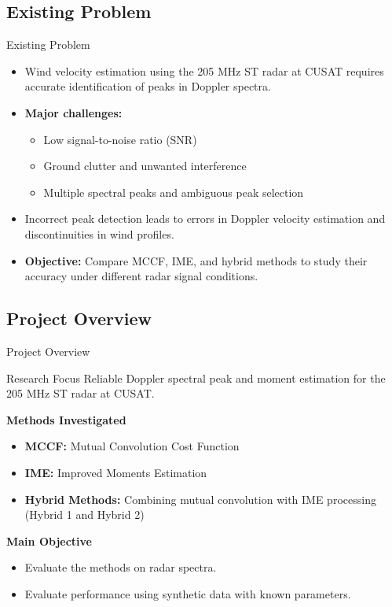 \documentclass[10.5pt]{beamer}
\begin{document}
\subsection{Existing Problem}
\begin{frame}{Existing Problem}
\begin{itemize}
    \item Wind velocity estimation using the 205 MHz ST radar at CUSAT requires accurate identification of peaks in Doppler spectra.

    \item \textbf{Major challenges:}
    \begin{itemize}
        \item Low signal-to-noise ratio (SNR)
        \item Ground clutter and unwanted interference
        \item Multiple spectral peaks and ambiguous peak selection
    \end{itemize}

    \item Incorrect peak detection leads to errors in Doppler velocity
    estimation and discontinuities in wind profiles.

    \item \textbf{Objective:} Compare MCCF, IME, and hybrid methods
    to study their accuracy under different radar signal conditions.
\end{itemize}
\end{frame}

\subsection{Project Overview}
\begin{frame}{Project Overview}
\begin{block}{Research Focus}
Reliable Doppler spectral peak and moment estimation
for the 205 MHz ST radar at CUSAT.
\end{block}

\vspace{0.15cm}

\textbf{Methods Investigated}
\begin{itemize}
    \item \textbf{MCCF:} Mutual Convolution Cost Function
    \item \textbf{IME:} Improved Moments Estimation
    \item \textbf{Hybrid Methods:} Combining mutual convolution with IME processing (Hybrid 1 and Hybrid 2)
\end{itemize}

\vspace{0.15cm}

\textbf{Main Objective}
\begin{itemize}
    \item Evaluate the methods on radar spectra.
    \item Evaluate performance using synthetic data with known parameters.
\end{itemize}

\end{frame}
\end{document}

